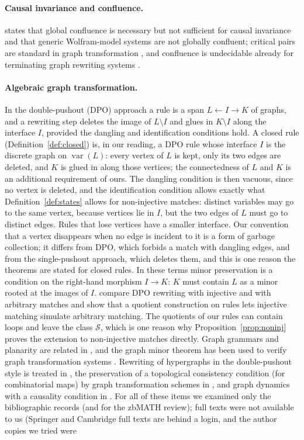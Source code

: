 \documentclass[10pt]{article}
\theoremstyle{definition}
\theoremstyle{plain}
\theoremstyle{remark}
\DeclareMathOperator{\var}{var}
\begin{document}
\paragraph{Causal invariance and confluence.} \citet{gorard2020algorithmic} states that global confluence is necessary but not sufficient for causal invariance and that generic Wolfram-model systems are not globally confluent; critical pairs are standard in graph transformation \citep{ehrig2006}, and confluence is undecidable already for terminating graph rewriting systems \citep{plump2005}.

\paragraph{Algebraic graph transformation.} In the double-pushout (DPO) approach \citep{ehrig2006} a rule is a span $L\leftarrow I\rightarrow K$ of graphs, and a rewriting step deletes the image of $L\setminus I$ and glues in $K\setminus I$ along the interface $I$, provided the dangling and identification conditions hold. A closed rule (Definition~\ref{def:closed}) is, in our reading, a DPO rule whose interface $I$ is the discrete graph on $\var(L)$: every vertex of $L$ is kept, only its two edges are deleted, and $K$ is glued in along those vertices; the connectedness of $L$ and $K$ is an additional requirement of ours. The dangling condition is then vacuous, since no vertex is deleted, and the identification condition allows exactly what Definition~\ref{def:states} allows for non-injective matches: distinct variables may go to the same vertex, because vertices lie in $I$, but the two edges of $L$ must go to distinct edges. Rules that lose vertices have a smaller interface. Our convention that a vertex disappears when no edge is incident to it is a form of garbage collection; it differs from DPO, which forbids a match with dangling edges, and from the single-pushout approach, which deletes them, and this is one reason the theorems are stated for closed rules. In these terms minor preservation is a condition on the right-hand morphism $I\to K$: $K$ must contain $L$ as a minor rooted at the images of $I$. \citet{habel2001dpo} compare DPO rewriting with injective and with arbitrary matches and show that a quotient construction on rules lets injective matching simulate arbitrary matching. The quotients of our rules can contain loops and leave the class $\mathcal S$, which is one reason why Proposition~\ref{prop:noninj} proves the extension to non-injective matches directly. Graph grammars and planarity are related in \citet{montanari1970web,pascu1979planarity}, and the graph minor theorem has been used to verify graph transformation systems \citep{joshi2008minor}. Rewriting of hypergraphs in the double-pushout style is treated in \citet{llabres1997dpo}, the preservation of a topological consistency condition (for combinatorial maps) by graph transformation schemes in \citet{pascual2022topological}, and graph dynamics with a causality condition in \citet{arrighi2012causal}. For all of these items we examined only the bibliographic records (and for \citet{habel2001dpo} the zbMATH review); full texts were not available to us (Springer and Cambridge full texts are behind a login, and the author copies we tried were 
\end{document}
